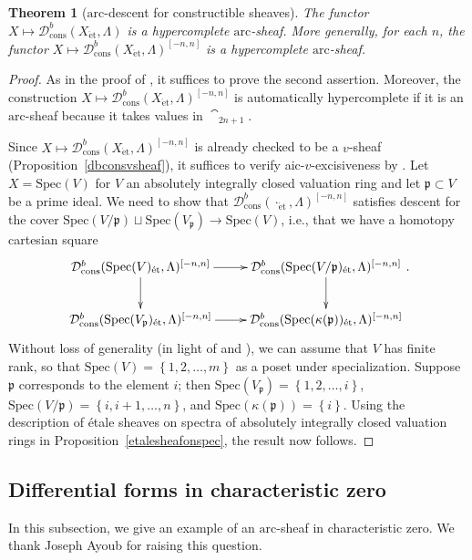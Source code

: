 \documentclass[reqno]{amsart}
\newcommand{\spec}{\mathrm{Spec}}
\newcommand{\et}{\mathrm{\acute{e}t}}
\newcommand{\arc}{\mathrm{arc}}
\newcommand{\D}{\mathcal{D}}
\newtheorem{theorem}{Theorem}[section]
\theoremstyle{definition}
\begin{document}
\begin{theorem}[$\arc$-descent for constructible sheaves] 
\label{arcConsDer}
The functor $X \mapsto \D^b_{\mathrm{cons}}(X_{\et}, \Lambda)$ is a hypercomplete $\arc$-sheaf. 
More generally, for each $n$, the functor $X \mapsto \D^b_{\mathrm{cons}}(X_{\et}, \Lambda)^{[-n, n]}$
is a hypercomplete $\arc$-sheaf. 
\end{theorem} 
\begin{proof} 
As in the proof of , 
it suffices to prove 
the second assertion.
Moreover, the construction $X \mapsto \D^b_{\mathrm{cons}}(X_{\et}, \Lambda)^{[-n, n]}$ is
automatically hypercomplete if it is an $\arc$-sheaf because it takes values in
$\cat_{2n+1}$. 


Since 
$X \mapsto \D^b_{\mathrm{cons}}(X_{\et}, \Lambda)^{[-n, n]}$
is already checked to be a $v$-sheaf (Proposition~\ref{dbconsvsheaf}), 
it suffices to verify aic-$v$-excisiveness by . Let $X =
\spec(V)$ for $V$ an absolutely integrally closed valuation ring and let $\mathfrak{p} \subset V$ be a
prime ideal. We need to show that 
$\D^b_{\mathrm{cons}}( \cdot_{\et}, \Lambda)^{[-n, n]}$ satisfies descent for the cover $\spec(
V/\mathfrak{p}) \sqcup \spec( V_{\mathfrak{p}}) \to \spec( V)$, i.e., that we
have a homotopy cartesian square
\[ \xymatrix{
\D^b_{\mathrm{cons}}( \spec(V)_{\et}, \Lambda)^{[-n, n]} \ar[d]  \ar[r] &  \D^b_{\mathrm{cons}}( \spec(
V/\mathfrak{p})_{\et}, \Lambda)^{[-n, n]} \ar[d]  \\
\D^b_{\mathrm{cons}}( \spec(V_{\mathfrak{p}})_{\et}, \Lambda )^{[-n, n]} \ar[r] &  \D^b_{\mathrm{cons}}( \spec(
\kappa(\mathfrak{p}))_{\et}, \Lambda)^{[-n, n]}
}.\]
Without loss of generality (in light of  and
), 
we can assume that $V$ has finite rank, so that $\spec(V) = \left\{1, 2,
\dots, m\right\}$ as a poset under specialization. Suppose $\mathfrak{p}$
corresponds to the element $i$; then 
$\spec(V_{\mathfrak{p}}) = \left\{1, 2, \dots, i\right\}$, $\spec(
V/\mathfrak{p}) = \left\{i, i+1, \dots, n\right\}$, and $\spec( \kappa(
\mathfrak{p})) = \left\{i\right\}$. Using the description of \'etale sheaves on
spectra of absolutely integrally closed valuation rings 
in Proposition~\ref{etalesheafonspec}, the result now follows. 
\end{proof} 

\subsection{Differential forms in characteristic zero}
In this subsection, we give an example of an $\arc$-sheaf in characteristic
zero. 
We thank Joseph Ayoub for raising this question. 
\end{document}

